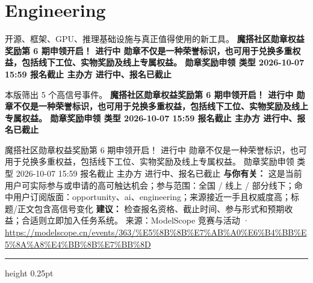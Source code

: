 \documentclass[10.5pt]{ctexart}
\begin{document}
\section*{Engineering}
{\color{ormuted} 开源、框架、GPU、推理基础设施与真正值得使用的新工具。}
\vspace{2mm}
{\LARGE\bfseries 魔搭社区勋章权益奖励第 6 期申领开启！ 进行中 勋章不仅是一种荣誉标识，也可用于兑换多重权益，包括线下工位、实物奖励及线上专属权益。 勋章奖励申领 类型 2026-10-07 15:59 报名截止 主办方 进行中、报名已截止}\par
\vspace{1mm}
{\color{ormuted} 本版筛出 5 个高信号事件。}
\vspace{3mm}
{\Large\bfseries 魔搭社区勋章权益奖励第 6 期申领开启！ 进行中 勋章不仅是一种荣誉标识，也可用于兑换多重权益，包括线下工位、实物奖励及线上专属权益。 勋章奖励申领 类型 2026-10-07 15:59 报名截止 主办方 进行中、报名已截止}\par
魔搭社区勋章权益奖励第 6 期申领开启！ 进行中 勋章不仅是一种荣誉标识，也可用于兑换多重权益，包括线下工位、实物奖励及线上专属权益。 勋章奖励申领 类型 2026-10-07 15:59 报名截止 主办方 进行中、报名已截止
\textbf{与你有关：} 这是当前用户可实际参与或申请的高可触达机会；参与范围：全国 / 线上 / 部分线下；命中用户订阅版面：opportunity、ai、engineering；来源接近一手且权威度高；标题/正文包含高信号变化
\textbf{建议：} 检查报名资格、截止时间、参与形式和预期收益；合适则立即加入任务系统。
{\footnotesize\color{ormuted} 来源：ModelScope 竞赛与活动 · \url{https://modelscope.cn/events/363/%E5%8B%8B%E7%AB%A0%E6%B4%BB%E5%8A%A8%E4%BB%8B%E7%BB%8D}}
\vspace{4mm}
\hrule height 0.25pt
\vspace{3mm}
\end{document}
